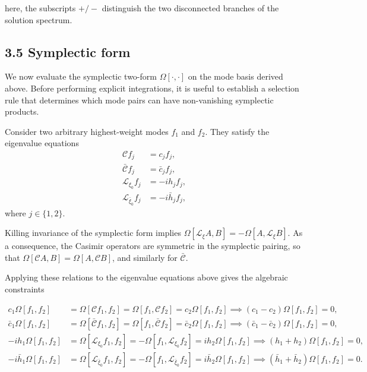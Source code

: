 here, the subscripts $\displaystyle{+/-}$ distinguish the two disconnected branches of the solution spectrum.

\subsection{3.5 Symplectic form}\label{subsec:symplectic-form}

We now evaluate the symplectic two-form $\Omega[\cdot,\cdot]$ on the mode basis derived above. Before performing explicit integrations, it is useful to establish a selection rule that determines which mode pairs can have non-vanishing symplectic products.

Consider two arbitrary highest-weight modes $f_1$ and $f_2$. They satisfy the eigenvalue equations  \begin{align}
\mathcal{C} f_j & = c_j f_j, \\
\mathcal{\bar{C}} f_j & = \bar{c}_j f_j, \\
\mathcal{L}_{\xi_0} f_j & = -i h_j f_j, \\
\mathcal{L}_{\bar{\xi}_0} f_j & = -i \bar{h}_j f_j,
\end{align}  where $j \in \{1, 2\}$.

Killing invariance of the symplectic form implies $\Omega[\mathcal{L}_{\xi} A, B] = - \Omega[A, \mathcal{L}_{\xi} B]$. As a consequence, the Casimir operators are symmetric in the symplectic pairing, so that $\Omega[\mathcal{C} A, B] = \Omega[A, \mathcal{C} B]$, and similarly for $\mathcal{\bar C}$.

Applying these relations to the eigenvalue equations above gives the algebraic constraints

 \begin{align}
c_1 \Omega[f_1, f_2] & = \Omega[\mathcal{C} f_1, f_2] = \Omega[f_1, \mathcal{C} f_2] = c_2 \Omega[f_1, f_2] \implies (c_1 - c_2) \Omega[f_1, f_2] = 0, \\
\bar{c}_1 \Omega[f_1, f_2] & = \Omega[\mathcal{\bar{C}} f_1, f_2] = \Omega[f_1, \mathcal{\bar{C}} f_2] = \bar{c}_2 \Omega[f_1, f_2] \implies (\bar{c}_1 - \bar{c}_2) \Omega[f_1, f_2] = 0, \\
-i h_1 \Omega[f_1, f_2] & = \Omega[\mathcal{L}_{\xi_0} f_1, f_2] = -\Omega[f_1, \mathcal{L}_{\xi_0} f_2] = i h_2 \Omega[f_1, f_2] \implies (h_1 + h_2) \Omega[f_1, f_2] = 0, \\
-i \bar{h}_1 \Omega[f_1, f_2] & = \Omega[\mathcal{L}_{\bar{\xi}_0} f_1, f_2] = -\Omega[f_1, \mathcal{L}_{\bar{\xi}_0} f_2] = i \bar{h}_2 \Omega[f_1, f_2] \implies (\bar{h}_1 + \bar{h}_2) \Omega[f_1, f_2] = 0.
\end{align}

